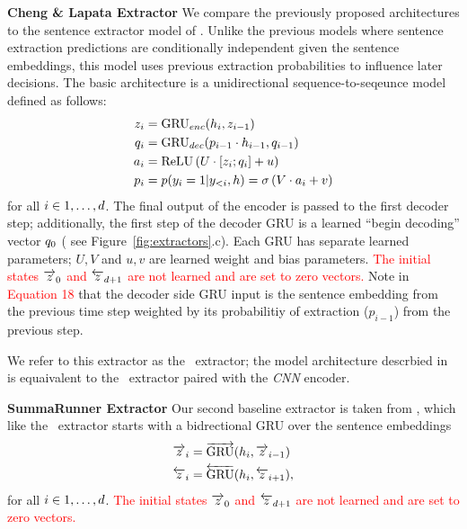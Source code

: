 \textbf{Cheng \& Lapata Extractor} 
We compare the previously proposed architectures to the sentence extractor
model of \cite{chenglapata}. Unlike the previous models where
sentence extraction predictions are conditionally independent given
the sentence embeddings, this model uses previous extraction probabilities to
influence later decisions. The basic architecture is a unidirectional
sequence-to-seqeunce
model defined as follows:
\begin{align}
    z_i &= \operatorname{GRU}_{enc}(h_i, z_{i-1}) \\
    q_i &= \operatorname{GRU}_{dec}(p_{i-1} \cdot h_{i-1}, q_{i-1}) \\
   a_i &= \operatorname{ReLU}\left(U \cdot [z_i; q_i] + u \right)\\
    p_i &= p(y_i=1|y_{<i}, h) = \sigma\left(V\cdot a_i + v  \right) 
\end{align}
for all $i \in 1, \ldots, d$.
The final output of the encoder is passed to the first decoder
step; additionally, the first step of the decoder GRU is a learned 
``begin decoding'' vector $q_0$ (
see Figure~\ref{fig:extractors}.c).
Each GRU has separate learned 
parameters; $U, V$ and $u, v$ are learned weight and bias parameters.
\textcolor{red}{The initial states $\overrightarrow{z}_0$ and $\overleftarrow{z}_{d + 1}$ are not 
learned and are set to zero vectors.}
 Note in \textcolor{red}{Equation 18} that 
the decoder side GRU input is the sentence embedding from the previous time
step weighted by its probabilitiy of extraction ($p_{i-1}$) from the 
previous step.

We refer to this extractor as the \baselineOneBF~extractor; the model 
architecture descrbied in \cite{cl} is equaivalent to the
\baselineOneBF~extractor paired with the \textit{CNN} encoder.


\textbf{SummaRunner Extractor}
Our second baseline extractor is taken from \cite{nallapati}, which like the
\modelOneBF~extractor starts with a bidrectional GRU over the sentence 
embeddings 
\begin{align}
  \overrightarrow{z}_i &= \overrightarrow{\operatorname{GRU}}(h_i, \overrightarrow{z}_{i-1}) \\
  \overleftarrow{z}_i &= \overleftarrow{\operatorname{GRU}}(h_i, \overleftarrow{z}_{i+1}),
\end{align}
for all $i \in 1,\ldots,d$. 
\textcolor{red}{The initial states $\overrightarrow{z}_0$ and $\overleftarrow{z}_{d + 1}$ are not
learned and are set to zero vectors.}


